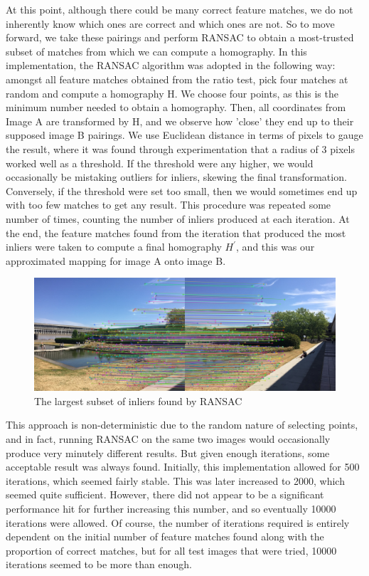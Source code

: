 \documentclass[]{article}
\begin{document}
At this point, although there could be many correct feature matches, we do not inherently know which ones are correct and which ones are not. So to move forward, we take these pairings and perform RANSAC to obtain a most-trusted subset of matches from which we can compute a homography. In this implementation, the RANSAC algorithm was adopted in the following way: amongst all feature matches obtained from the ratio test, pick four matches at random and compute a homography H. We choose four points, as this is the minimum number needed to obtain a homography. Then, all coordinates from Image A are transformed by H, and we observe how 'close' they end up to their supposed image B pairings. We use Euclidean distance in terms of pixels to gauge the result, where it was found through experimentation that a radius of 3 pixels worked well as a threshold. If the threshold were any higher, we would occasionally be mistaking outliers for inliers, skewing the final transformation. Conversely, if the threshold were set too small, then we would sometimes end up with too few matches to get any result. This procedure was repeated some number of times, counting the number of inliers produced at each iteration. At the end, the feature matches found from the iteration that produced the most inliers were taken to compute a final homography $H^\prime$, and this was our approximated mapping for image A onto image B.

\begin{figure}[h]
	\includegraphics[scale=0.55]{results/p1_noblend/3}
	\centering
	\caption{The largest subset of inliers found by RANSAC}
\end{figure}

This approach is non-deterministic due to the random nature of selecting points, and in fact, running RANSAC on the same two images would occasionally produce very minutely different results. But given enough iterations, some acceptable result was always found. Initially, this implementation allowed for 500 iterations, which seemed fairly stable. This was later increased to 2000, which seemed quite sufficient. However, there did not appear to be a significant performance hit for further increasing this number, and so eventually 10000 iterations were allowed. Of course, the number of iterations required is entirely dependent on the initial number of feature matches found along with the proportion of correct matches, but for all test images that were tried, 10000 iterations seemed to be more than enough.
\end{document}
